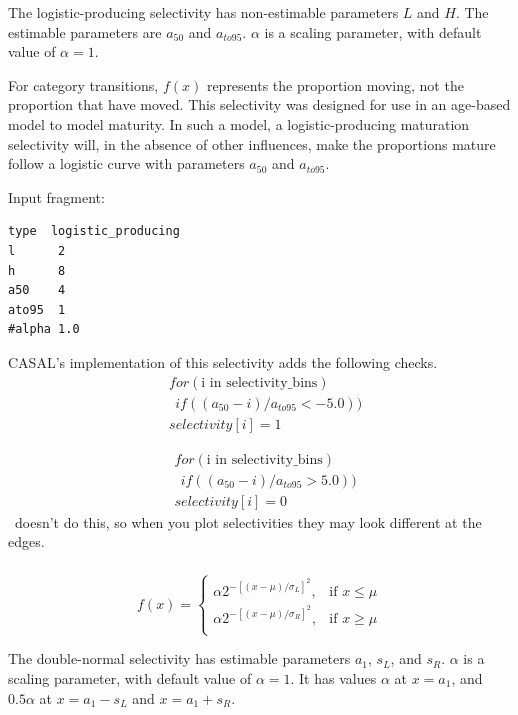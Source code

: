 The logistic-producing selectivity has non-estimable parameters $L$ and $H$. The estimable parameters are $a_{50}$ and $a_{to95}$. $\alpha$ is a scaling parameter, with default value of $\alpha = 1$.

For category transitions, $f(x)$ represents the proportion moving, not the proportion that have moved. This selectivity was designed for use in an age-based model to model maturity. In such a model, a logistic-producing maturation selectivity will, in the absence of other influences, make the proportions mature follow a logistic curve with parameters $a_{50}$ and $a_{to95}$.

Input fragment: {\small{\begin{verbatim}
type  logistic_producing
l      2
h      8
a50    4
ato95  1
#alpha 1.0
\end{verbatim}}}


CASAL's implementation of this selectivity adds the following checks.
\begin{align*}
	&for(\text{i in selectivity\_bins}) \\
	& \ \ if((a_{50} - i)/a_{to95} < -5.0))\\
	&selectivity[i] = 1
\end{align*}

\begin{align*}
&for(\text{i in selectivity\_bins}) \\
& \ \ if((a_{50} - i)/a_{to95} > 5.0))\\
&selectivity[i] = 0
\end{align*}
\CNAME\ doesn't do this, so when you plot selectivities they may look different at the edges.

\subsubsection[Double-normal]{}\label{sec:Selectivity-DoubleNormal}

\begin{equation}
  f(x) = \begin{cases}
    \alpha 2^{-[(x- \mu)/\sigma_L ]^2}, & \text{if $x \leq \mu$} \\
    \alpha 2^{-[(x- \mu)/\sigma_R ]^2}, & \text{if $x \ge \mu$}\\
  \end{cases}
\end{equation}

The double-normal selectivity has estimable parameters $a_1$, $s_L$, and $s_R$. $\alpha$ is a scaling parameter, with default value of $\alpha = 1$. It has values $\alpha$ at $x=a_1$, and $0.5 \alpha$ at $x=a_1-s_L$ and $x=a_1+s_R$.

